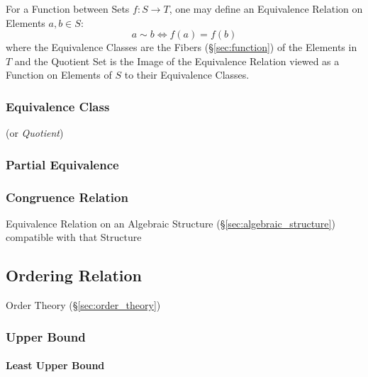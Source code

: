 For a Function between Sets $f : S \rightarrow T$, one may define an
Equivalence Relation on Elements $a,b \in S$:
\[
    a \sim b \Leftrightarrow f(a) = f(b)
\]
where the Equivalence Classes are the Fibers (\S\ref{sec:function}) of
the Elements in $T$ and the Quotient Set is the Image of the
Equivalence Relation viewed as a Function on Elements of $S$ to their
Equivalence Classes.



\subsubsection{Equivalence Class}\label{sec:equivalence_class}

(or \emph{Quotient})



\subsubsection{Partial Equivalence}\label{sec:partial_equivalence}

\subsubsection{Congruence Relation}\label{sec:congruence_relation}

Equivalence Relation on an Algebraic Structure
(\S\ref{sec:algebraic_structure}) compatible with that Structure



\subsection{Ordering Relation}\label{sec:ordering_relation}

Order Theory (\S\ref{sec:order_theory})



\subsubsection{Upper Bound}\label{sec:upper_bound}

\paragraph{Least Upper Bound}\label{sec:least_upperbound}
\hfill \\

